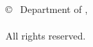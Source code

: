 \thispagestyle{empty}
\jamdanibg
\begin{center}
\vspace*{\fill}
{\copyright~ Department of \textit{\Department}, \\ \textit{\University} \\ 
All rights reserved. }
\vspace*{\fill} 
\end{center}